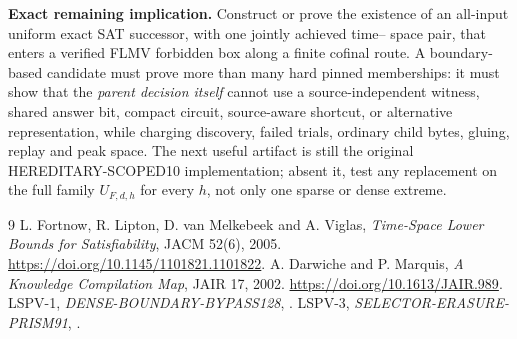 \documentclass[11pt]{article}
\begin{document}
\textbf{Exact remaining implication.}  Construct or prove the existence of
an all-input uniform exact SAT successor, with one jointly achieved time--
space pair, that enters a verified FLMV forbidden box along a finite cofinal
route.  A boundary-based candidate must prove more than many hard pinned
memberships: it must show that the \emph{parent decision itself} cannot use
a source-independent witness, shared answer bit, compact circuit,
source-aware shortcut, or alternative representation, while charging
discovery, failed trials, ordinary child bytes, gluing, replay and peak
space.  The next useful artifact is still the original
HEREDITARY-SCOPED10 implementation; absent it, test any replacement on the
full family $U_{F,d,h}$ for every $h$, not only one sparse or dense extreme.

\begin{thebibliography}{9}
 L. Fortnow, R. Lipton, D. van Melkebeek and A. Viglas,
\emph{Time-Space Lower Bounds for Satisfiability}, JACM 52(6), 2005.
\url{https://doi.org/10.1145/1101821.1101822}.
 A. Darwiche and P. Marquis,
\emph{A Knowledge Compilation Map}, JAIR 17, 2002.
\url{https://doi.org/10.1613/JAIR.989}.
 LSPV-1, \emph{DENSE-BOUNDARY-BYPASS128},
.
 LSPV-3, \emph{SELECTOR-ERASURE-PRISM91},
.
\end{thebibliography}
\end{document}
